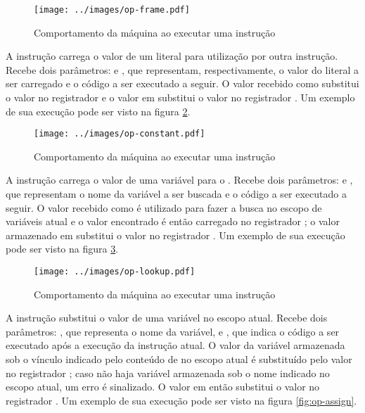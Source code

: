 \begin{figure}[h!]
\centering
\texttt{[image: ../images/op-frame.pdf]}
\caption{Comportamento da máquina ao executar uma instrução }
\label{fig:op-frame}
\end{figure}


A instrução   carrega o valor de um literal
para utilização por outra instrução. Recebe dois parâmetros:  e
, que representam, respectivamente, o valor do literal a ser
carregado e o código a ser executado a seguir. O valor recebido como
 substitui o valor no registrador  e o valor em
 substitui o valor no registrador . Um exemplo de sua execução pode ser visto na figura
\ref{fig:op-constant}.

\begin{figure}[h!]
\centering
\texttt{[image: ../images/op-constant.pdf]}
\caption{Comportamento da máquina ao executar uma instrução }
\label{fig:op-constant}
\end{figure}


A instrução   carrega o valor de uma variável
para o . Recebe dois parâmetros:  e ,
que representam o nome da variável a ser buscada e o código a ser executado a
seguir. O valor recebido como  é utilizado para fazer a busca no
escopo de variáveis atual e o valor encontrado é então carregado no registrador
; o valor armazenado em  substitui o valor no
registrador . Um exemplo de sua execução pode ser visto na figura
\ref{fig:op-lookup}.

\begin{figure}[h!]
\centering
\texttt{[image: ../images/op-lookup.pdf]}
\caption{Comportamento da máquina ao executar uma instrução }
\label{fig:op-lookup}
\end{figure}


A instrução   substitui o valor de uma variável
no escopo atual. Recebe dois parâmetros: , que representa o nome da
variável, e , que indica o código a ser executado após a execução
da instrução atual. O valor da variável armazenada sob o vínculo indicado pelo
conteúdo de  no escopo atual é substituído pelo valor no registrador
; caso não haja variável armazenada sob o nome indicado no
escopo atual, um erro é sinalizado.  O valor em  então substitui
o valor no registrador . Um exemplo de sua execução pode ser visto na figura
\ref{fig:op-assign}.

